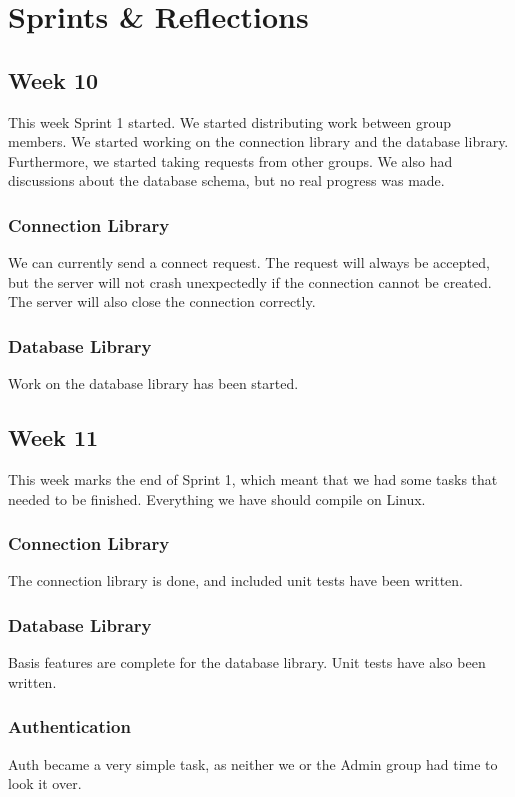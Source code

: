 \section{Sprints \& Reflections}
\subsection{Week 10}
This week Sprint 1 started. We started distributing work between group members. We started working on the connection library and the database library. Furthermore, we started taking requests from other groups. We also had discussions about the database schema, but no real progress was made.


\subsubsection*{Connection Library}
We can currently send a connect request. The request will always be accepted, but the server will not crash unexpectedly if the connection cannot be created. The server will also close the connection correctly.


\subsubsection*{Database Library}
Work on the database library has been started.


\subsection{Week 11}
This week marks the end of Sprint 1, which meant that we had some tasks that needed to be finished. Everything we have should compile on Linux.


\subsubsection*{Connection Library}
The connection library is done, and included unit tests have been written.


\subsubsection*{Database Library}
Basis features are complete for the database library. Unit tests have also been written.


\subsubsection*{Authentication}
Auth became a very simple task, as neither we or the Admin group had time to look it over.


